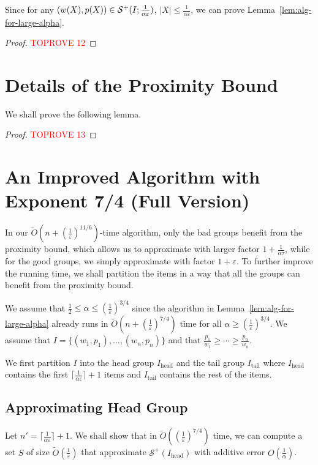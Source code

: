 \documentclass[a4paper,UKenglish,cleveref, autoref, thm-restate, pdfa]{lipics-v2021}
\newcommand{\eps}{\varepsilon}
\renewcommand{\leq}{\leqslant}
\renewcommand{\geq}{\geqslant}
\begin{document}
Since for any $(w(X),p(X))\in {\cal S}^+(I;\frac{1}{\alpha\eps})$, $|X|\leq \frac{1}{\alpha\eps}$, we can prove Lemma~\ref{lem:alg-for-large-alpha}.

\begin{proof}\textcolor{red}{TOPROVE 12}\end{proof}


\section{Details of the Proximity Bound}\label{app:proximity}
We shall prove the following lemma.
\lemproximity*
    
\begin{proof}\textcolor{red}{TOPROVE 13}\end{proof}




\section{An Improved Algorithm with Exponent 7/4 (Full Version)}\label{app:strong}
In our $\tilde{O}(n + (\frac{1}{\eps})^{11/6})$-time algorithm, only the bad groups benefit from the proximity bound, which allows us to approximate with larger factor $1 + \frac{1}{\alpha\tau}$, while for the good groups, we simply approximate with factor $1 + \eps$. To further improve the running time, we shall partition the items in a way that all the groups can benefit from the proximity bound.

We assume that $\frac{1}{2}\leq \alpha \leq (\frac{1}{\eps})^{3/4}$ since the algorithm in Lemma~\ref{lem:alg-for-large-alpha} already runs in $\tilde{O}(n + (\frac{1}{\eps})^{7/4})$ time for all $\alpha \geq (\frac{1}{\eps})^{3/4}$. We assume that $I = \{(w_1, p_1), \ldots, (w_n, p_n)\}$ and that $\frac{p_1}{w_1} \geq \cdots \geq \frac{p_n}{w_n}$.

We first partition $I$ into the head group $I_{\mathrm{head}}$ and the tail group $I_{\mathrm{tail}}$ where $I_{\mathrm{head}}$ contains the first $\lceil \frac{1}{\alpha\eps}\rceil + 1 $ items and $I_{\mathrm{tail}}$ contains the rest of the items.

\subsection{Approximating Head Group}\label{sec:strong-head}
Let $n' = \lceil \frac{1}{\alpha\eps}\rceil + 1$.  We shall show that in $\tilde{O}((\frac{1}{\eps})^{7/4})$ time, we can compute a set $S$ of size $\tilde{O}(\frac{1}{\eps})$ that approximate $\mathcal{S}^+(I_{\mathrm{head}})$ with additive error $O(\frac{1}{\alpha})$.
\end{document}
